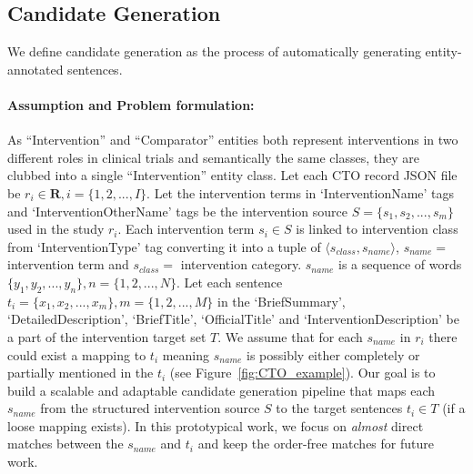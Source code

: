 \documentclass[11pt]{article}
\begin{document}
\subsection{Candidate Generation}
\label{subsec:candgen}
%
We define candidate generation as the process of automatically generating entity-annotated sentences.
%
\paragraph{Assumption and Problem formulation: }
As ``Intervention'' and ``Comparator'' entities both represent interventions in two different roles in clinical trials and semantically the same classes, they are clubbed into a single ``Intervention'' entity class.
Let each CTO record JSON file be $r_i \in \boldsymbol{R}, i = \{ 1, 2, ... , I \}$.
Let the intervention terms in `InterventionName' tags and `InterventionOtherName' tags be the intervention source $S = \{ s_1, s_2, ... , s_m \}$ used in the study $r_i$.
Each intervention term $s_i \in S$ is linked to intervention class from `InterventionType' tag converting it into a tuple of $ \langle s_{class}, s_{name} \rangle$, $s_{name} =$ intervention term and $s_{class} =$ intervention category.
$s_{name}$ is a sequence of words $\{ y_1, y_2, ... , y_n \}, n = \{ 1, 2, ... , N \} $.
Let each sentence $t_i = \{ x_1, x_2, ... , x_m \}, m = \{ 1, 2, ... , M \}$ in the `BriefSummary', `DetailedDescription', `BriefTitle', `OfficialTitle' and `InterventionDescription' be a part of the intervention target set $T$.
We assume that for each $s_{name}$ in $r_i$ there could exist a mapping to $t_i$ meaning $s_{name}$ is possibly either completely or partially mentioned in the $t_i$ (see Figure~\ref{fig:CTO_example}).
Our goal is to build a scalable and adaptable candidate generation pipeline that maps each $s_{name}$ from the structured intervention source $S$ to the target sentences $t_i \in T$ (if a loose mapping exists).
In this prototypical work, we focus on \textit{almost} direct matches between the $s_{name}$ and $t_i$ and keep the order-free matches for future work.
%
\end{document}
